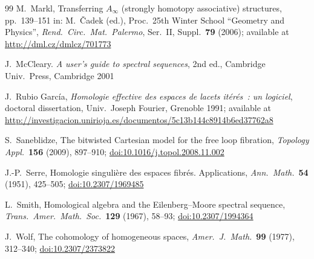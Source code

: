 \documentclass[letterpaper]{amsart}
\def\doi#1{\href{http://doi.org/#1}{doi:#1}}
\numberwithin{equation}{section}
\theoremstyle{plain}
\theoremstyle{definition}
\theoremstyle{remark}
\def\Ainf{A_{\infty}}
\begin{document}
\begin{thebibliography}{99}
M.~Markl,
\newblock Transferring $\Ainf$ (strongly homotopy associative) structures,
\newblock pp.~139--151 in:
\newblock M.~Čadek (ed.), Proc.\ 25th Winter School ``Geometry and Physics'',
\newblock \textit{Rend.\ Circ.\ Mat.\ Palermo}, Ser.~II, Suppl.\ \textbf{79} (2006);
\newblock available at \url{http://dml.cz/dmlcz/701773}

J.~McCleary.
\newblock \textit{A user's guide to spectral sequences}, 2nd ed.,
\newblock Cambridge Univ.\ Press, Cambridge 2001

J.~Rubio García,
\newblock \textit{Homologie effective des espaces de lacets itérés~: un logiciel},
\newblock doctoral dissertation, Univ.\ Joseph Fourier, Grenoble 1991;
\newblock available at \url{http://investigacion.unirioja.es/documentos/5c13b144c8914b6ed37762a8}

S.~Saneblidze,
\newblock The bitwisted Cartesian model for the free loop fibration,
\newblock \textit{Topology Appl.}~\textbf{156} (2009), 897--910;
\newblock \doi{10.1016/j.topol.2008.11.002}

J.-P.~Serre,
\newblock Homologie singulière des espaces fibrés. Applications,
\newblock \textit{Ann.\ Math.}~\textbf{54} (1951), 425--505;
\newblock \doi{10.2307/1969485}

L.~Smith,
\newblock Homological algebra and the Eilenberg--Moore spectral sequence,
\newblock \textit{Trans.\ Amer.\ Math.\ Soc.}~\textbf{129} (1967), 58--93;
\newblock \doi{10.2307/1994364}

J.~Wolf,
\newblock The cohomology of homogeneous spaces,
\newblock \textit{Amer.\ J.\ Math.}~\textbf{99} (1977), 312--340;
\newblock \doi{10.2307/2373822}

\end{thebibliography}
\end{document}
